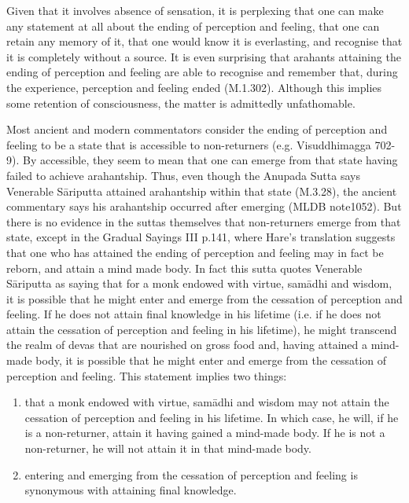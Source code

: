 Given that it involves absence of sensation, it is perplexing that one can make any statement at all about the ending of perception and feeling, that one can retain any memory of it, that one would know it is everlasting, and recognise that it is completely without a source. It is even surprising that arahants attaining the ending of perception and feeling are able to recognise and remember that, during the experience, perception and feeling ended (M.1.302). Although this implies some retention of consciousness, the matter is admittedly unfathomable.

Most ancient and modern commentators consider the ending of perception and feeling to be a state that is accessible to non-returners (e.g. Visuddhimagga 702-9). By accessible, they seem to mean that one can emerge from that state having failed to achieve arahantship. Thus, even though the Anupada Sutta says Venerable Sāriputta attained arahantship within that state (M.3.28), the ancient commentary says his arahantship occurred after emerging (MLDB note1052). But there is no evidence in the suttas themselves that non-returners emerge from that state, except in the Gradual Sayings III p.141, where Hare's translation suggests that one who has attained the ending of perception and feeling may in fact be reborn, and attain a mind made body. In fact this sutta quotes Venerable S\=ariputta as saying that for a monk endowed with virtue, sam\=adhi and wisdom, it is possible that he might enter and emerge from the cessation of perception and feeling. If he does not attain final knowledge in his lifetime (i.e. if he does not attain the cessation of perception and feeling in his lifetime), he might transcend the realm of devas that are nourished on gross food and, having attained a mind-made body, it is possible that he might enter and emerge from the cessation of perception and feeling. This statement implies two things:

\begin{enumerate}
\item that a monk endowed with virtue, sam\=adhi and wisdom may not attain the cessation of perception and feeling in his lifetime. In which case, he will, if he is a non-returner, attain it having gained a mind-made body. If he is not a non-returner, he will not attain it in that mind-made body.
\item entering and emerging from the cessation of perception and feeling is synonymous with attaining final knowledge.
\end{enumerate}

